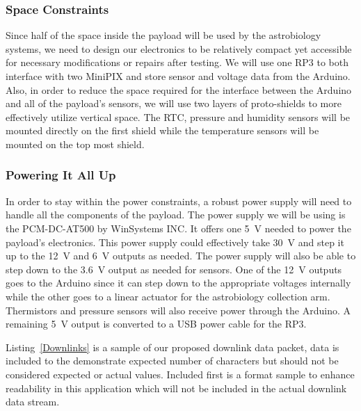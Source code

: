 \subsubsection{Space Constraints}
Since half of the space inside the payload will be used by the astrobiology systems, we need to design our electronics to be relatively compact yet accessible for necessary modifications or repairs after testing. We will use one RP3 to both interface with two MiniPIX and store sensor and voltage data from the Arduino.  Also, in order to reduce the space required for the interface between the Arduino and all of the payload's sensors, we will use two layers of proto-shields to more effectively utilize vertical space. The RTC, pressure and humidity sensors will be mounted directly on the first shield while the temperature sensors will be mounted on the top most shield.

 \subsubsection{Powering It All Up}

 In order to stay within the power constraints, a robust power supply will need to  handle all the components of the payload.  The power supply we will be using is the PCM-DC-AT500 by WinSystems INC.  It offers one \SI{+5}{\volt} needed to power the payload's electronics.  This power supply could effectively take \SI{+30}{\volt} and step it up to the \SI{+12}{\volt} and \SI{+6}{\volt} outputs as needed. The power supply will also be able to step down to the \SI{+3.6 }{\volt} output as needed for sensors. One of the \SI{+12}{\volt} outputs goes to the Arduino since it can step down to the appropriate voltages internally while the other goes to a linear actuator for the astrobiology collection arm. Thermistors and pressure sensors will also receive power through the Arduino. A remaining \SI{+5 }{\volt} output is converted to a USB power cable for the RP3.


Listing~\ref{Downlinks} is a sample of our proposed downlink data packet, data is included to the demonstrate expected number of characters but should not be considered expected or actual values. Included first is a format sample to enhance readability in this application which will not be included in the actual downlink data stream.

